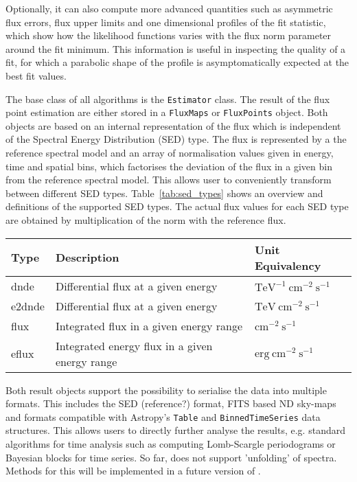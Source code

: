 \documentclass[traditabstract, longauth]{aa}
\newcommand{\code}[1]{\texttt{#1}}
\begin{document}
Optionally, it can also compute more advanced quantities
such as asymmetric flux errors, flux upper limits
and one dimensional profiles of the fit statistic,
which show how the likelihood functions varies with
the flux norm parameter around the fit minimum.
This information is useful in inspecting the quality
of a fit, for which  a parabolic
shape of the profile is asymptomatically expected at the best fit
values.

The base class of all algorithms is the \code{Estimator}  class.
The result of the flux point estimation are either stored in a
\code{FluxMaps} or \code{FluxPoints} object. Both objects
are based on an internal representation of the flux which is
independent of the Spectral Energy Distribution (SED) type. The flux is represented by a
the reference spectral model and an array of
normalisation values given in energy, time and spatial bins,
which factorises the deviation of the flux in a given
bin from the reference spectral model. This allows
user to conveniently transform between different
SED types. Table~\ref{tab:sed_types} shows an
overview and definitions of the supported SED types.
The actual flux values for each SED type are obtained
by multiplication of the norm with the  reference flux.

\begin{table*}
    \begin{center}
        \begin{tabular}{lll}
         \hline
         Type & Description & Unit Equivalency \\
         \hline
         dnde & Differential flux at a given energy & $\mathrm{TeV^{-1}~cm^{-2}~s^{-1}}$ \\
         e2dnde & Differential flux at a given energy  & $\mathrm{TeV~cm^{-2}~s^{-1}}$ \\
         flux & Integrated flux in a given energy range & $\mathrm{cm^{-2}~s^{-1}}$ \\
         eflux & Integrated energy flux in a given energy range & $\mathrm{erg~cm^{-2}~s^{-1}}$\\
         \hline
        \end{tabular}
    \end{center}
    \label{tab:sed_types}
    \caption{Definition of the different SED types supported in \gammapy.}
\end{table*}


Both result objects support the possibility to serialise
the data into multiple formats. This includes the
\gadf SED (reference?) format, FITS based ND sky-maps
and formats compatible with Astropy's \code{Table} and
\code{BinnedTimeSeries} data structures. This allows
users to directly further analyse the results, e.g.
standard algorithms for time analysis such as
computing Lomb-Scargle periodograms or Bayesian
blocks for time series. So far, \gammapy does not
support 'unfolding' of \gammaray spectra.
Methods for this will be implemented in a future version of \gammapy.
\end{document}
